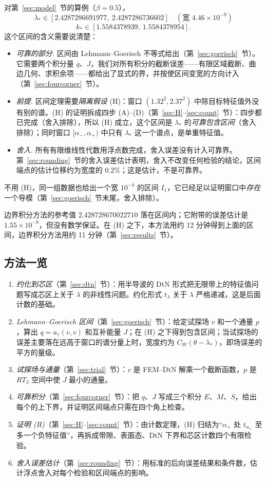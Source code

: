 \documentclass[11pt,a4paper,fontset=fandol]{ctexart}
\begin{document}
对第~\ref{sec:model}~节的算例（$\beta=0.5$），
\[
\boxed{\lambda_*\in[2.4287286691977,\ 2.4287286736602]\quad(\text{宽 }4.46\times10^{-9})}\]\[k_*\in[1.5584378939,\ 1.5584378954].
\]
这个区间的含义需要说清楚：
\begin{itemize}
\item \emph{可靠的部分.} 区间由 Lehmann--Goerisch 不等式给出（第~\ref{sec:goerisch}~节）。它需要两个积分量 $q$、$J$，我们对所有积分的截断误差——有限区域截断、曲边几何、求积余项——都给出了显式的界，并按使区间变宽的方向计入（第~\ref{sec:fourcorner}~节）。
\item \emph{前提.} 区间定理需要\emph{隔离假设} (H)：窗口 $(1.32^2,2.37^2)$ 中除目标特征值外没有别的谱。(H) 的证明拆成四步 (A)--(D)（第~\ref{sec:H}--\ref{sec:count}~节）：四步都已完成（舍入排除），所以 (H) 成立，这个区间是 $\lambda_*$ 的\emph{可靠包含区间}（舍入排除）；同时窗口 $[\alpha_-,\alpha_+)$ 中只有 $\lambda_*$ 这一个谱点，是单重特征值。
\item \emph{舍入.} 所有有限维线性代数用浮点数完成，舍入误差没有计入可靠界。第~\ref{sec:rounding}~节的舍入误差估计表明，舍入不改变任何检验的结论，区间端点的估计位移约为宽度的 $0.2\%$；这是估计，不是可靠界。
\end{itemize}
不用 (H)，同一组数据也给出一个宽 $10^{-4}$ 的区间 $I_1$，它已经足以证明窗口中\emph{存在}一个导模（第~\ref{sec:goerisch}~节末尾，舍入排除）。

边界积分方法的参考值 $2.428728670022710$ 落在区间内；它附带的误差估计是 $1.55\times10^{-9}$，但没有数学保证。在 (H) 之下，本方法用约 12 分钟得到上面的区间，边界积分方法用约 11 分钟（第~\ref{sec:results}~节）。

\subsection{方法一览}

\begin{enumerate}
\item \emph{约化到芯区}（第~\ref{sec:dtn}~节）：用半导波的 DtN 形式把无限带上的特征值问题写成芯区上关于 $\lambda$ 的非线性问题。约化形式 $t_\lambda$ 关于 $\lambda$ 严格递减，这是后面计数的基础。
\item \emph{Lehmann--Goerisch 区间}（第~\ref{sec:goerisch}~节）：给定试探场 $v$ 和一个通量 $p$，算出 $q=a_\gamma(v,v)$ 和互补能量 $J$；在 (H) 之下得到包含区间；当试探场的误差主要落在远高于窗口的谱分量上时，宽度约为 $C_W(\theta-\lambda_*)$，即场误差的平方的量级。
\item \emph{试探场与通量}（第~\ref{sec:trial}~节）：$v$ 是 FEM--DtN 解乘一个截断函数，$p$ 是 $RT_3$ 空间中使 $J$ 最小的通量。
\item \emph{可靠积分}（第~\ref{sec:fourcorner}~节）：把 $q$、$J$ 写成三个积分 $E$、$M$、$S$，给出每个的上下界，并证明区间端点只需在四个角上检查。
\item \emph{证明 (H)}（第~\ref{sec:H}--\ref{sec:count}~节）：由计数定理，(H) 归结为“$\alpha_+$ 处 $t_{\alpha_+}$ 至多一个负特征值”，再拆成带隙、表面态、DtN 下界和芯区计数四个有限检验。
\item \emph{舍入误差估计}（第~\ref{sec:rounding}~节）：用标准的后向误差结果和条件数，估计浮点舍入对每个检验和区间端点的影响。
\end{enumerate}
\end{document}
